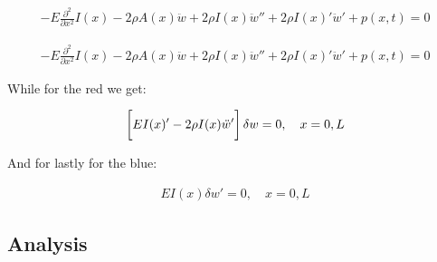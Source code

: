 \begin{equation}
    \begin{split}
        -E\frac{\partial ^2}{\partial x^2}I(x) - 2 \rho A(x)\ddot w + 2\rho I(x) \ddot w'' + 2\rho I(x)'\ddot w'+ p(x,t) = 0
    \end{split}
\end{equation}

\begin{equation}
    \begin{split}
        -E\frac{\partial ^2}{\partial x^2}I(x) - 2 \rho A(x)\ddot w + 2\rho I(x) \ddot w'' + 2\rho I(x)'\ddot w'+ p(x,t) = 0
    \end{split}
\end{equation}

While for the red we get:

\begin{equation}
    \begin{split}
        \left[\vphantom{\int}EI(x)' - 2\rho I(x) \ddot w'\right] \delta w = 0, \quad x = 0,L
    \end{split}
\end{equation}

And for lastly for the blue:

\begin{equation}
    \begin{split}
        E I(x) \delta w' = 0, \quad x = 0,L
    \end{split}
\end{equation}

\subsection{Analysis}

